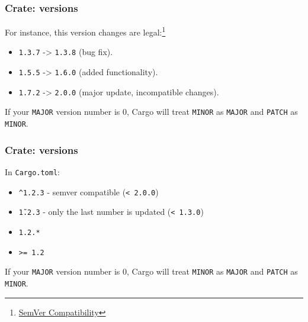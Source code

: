 \documentclass[aspectratio=1610,t]{beamer}
\begin{document}
\begin{frame}[fragile]
\frametitle{Crate: versions}
For instance, this version changes are legal:\footnote{\href{https://doc.rust-lang.org/cargo/reference/semver.html}{SemVer Compatibility}}

\begin{itemize}
    \item \texttt{1.3.7} -> \texttt{1.3.8} (bug fix).
    \item \texttt{1.5.5} -> \texttt{1.6.0} (added functionality).
    \item \texttt{1.7.2} -> \texttt{2.0.0} (major update, incompatible changes).
\end{itemize}

If your \texttt{MAJOR} version number is 0, Cargo will treat \texttt{MINOR} as \texttt{MAJOR} and \texttt{PATCH} as \texttt{MINOR}.
\end{frame}


\begin{frame}[fragile]
\frametitle{Crate: versions}
In \texttt{Cargo.toml}:

\begin{itemize}
    \item \texttt{\^{}1.2.3} - semver compatible (\texttt{< 2.0.0})
    \item \texttt{\~1.2.3} - only the last number is updated (\texttt{< 1.3.0})
    \item \texttt{1.2.*}
    \item \texttt{>= 1.2}
\end{itemize}

If your \texttt{MAJOR} version number is 0, Cargo will treat \texttt{MINOR} as \texttt{MAJOR} and \texttt{PATCH} as \texttt{MINOR}.
\end{frame}

\end{document}
